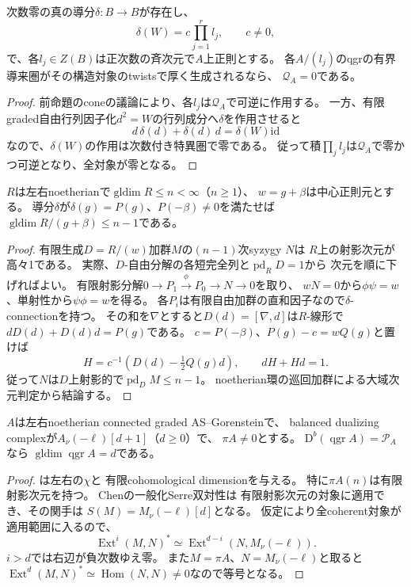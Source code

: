 \begin{proposition}[中心因子を持つ導分による切断判定]
\label{prop:gluing-derivation}
次数零の真の導分$\delta:B\to B$が存在し、
\[
 \delta(W)=c\prod_{j=1}^r l_j,\qquad c\ne0,
\]
で、各$l_j\in Z(B)$は正次数の斉次元で$A$上正則とする。
各$A/(l_j)$のqgrの有界導来圏がその構造対象のtwistsで厚く生成されるなら、
$\mathcal Q_A=0$である。
\end{proposition}
\begin{proof}
前命題のconeの議論により、各$l_j$は$\mathcal Q_A$で可逆に作用する。
一方、有限graded自由行列因子化$d^2=W$の行列成分へ$\delta$を作用させると
\[
 d\,\delta(d)+\delta(d)\,d=\delta(W)\mathrm{id}
\]
なので、$\delta(W)$の作用は次数付き特異圏で零である。
従って積$\prod_j l_j$は$\mathcal Q_A$で零かつ可逆となり、全対象が零となる。
\end{proof}

\begin{lemma}[中心値を動かす導分]
\label{lem:gluing-moving-central-value}
$R$は左右noetherianで$\operatorname{gldim}R\le n<\infty$（$n\ge1$）、
$w=g+\beta$は中心正則元とする。
導分$\delta$が$\delta(g)=P(g)$、$P(-\beta)\ne0$を満たせば
$\operatorname{gldim}R/(g+\beta)\le n-1$である。
\end{lemma}
\begin{proof}
有限生成$D=R/(w)$加群$M$の$(n-1)$次syzygy $N$は
$R$上の射影次元が高々1である。
実際、$D$-自由分解の各短完全列と$\operatorname{pd}_R D=1$から
次元を順に下げればよい。
有限射影分解$0\to P_1\xrightarrow{\phi}P_0\to N\to0$を取り、
$wN=0$から$\phi\psi=w$、単射性から$\psi\phi=w$を得る。
各$P_i$は有限自由加群の直和因子なので$\delta$-connectionを持つ。
その和を$\nabla$とすると$D(d)=[\nabla,d]$は$R$-線形で
$dD(d)+D(d)d=P(g)$である。
$c=P(-\beta)$、$P(g)-c=wQ(g)$と置けば
\[
 H=c^{-1}\left(D(d)-\tfrac12Q(g)d\right),\qquad dH+Hd=1.
\]
従って$N$は$D$上射影的で$\operatorname{pd}_D M\le n-1$。
noetherian環の巡回加群による大域次元判定から結論する。
\end{proof}

\begin{lemma}[perfect性とSerre双対性からの正確な次元]
\label{lem:gluing-serre-dimension}
$A$は左右noetherian connected graded AS--Gorensteinで、
balanced dualizing complexが$A_\nu(-\ell)[d+1]$（$d\ge0$）で、
$\pi A\ne0$とする。
$\mathrm D^b(\operatorname{qgr}A)=\mathcal P_A$なら
$\operatorname{gldim}\operatorname{qgr}A=d$である。
\end{lemma}
\begin{proof}
\cite[Theorem~4.2, Corollary~4.3]{YZSerre}は左右の$\chi$と
有限cohomological dimensionを与える。
特に$\pi A(n)$は有限射影次元を持つ。
Chen\cite[Theorem~3.10]{ChenGeneralizedSerre}の一般化Serre双対性は
有限射影次元の対象に適用でき、その関手は
$S(M)=M_\nu(-\ell)[d]$となる。
仮定により全coherent対象が適用範囲に入るので、
\[
 \operatorname{Ext}^i(M,N)^*
 \simeq\operatorname{Ext}^{d-i}(N,M_\nu(-\ell)).
\]
$i>d$では右辺が負次数ゆえ零。
また$M=\pi A$、$N=M_\nu(-\ell)$と取ると
$\operatorname{Ext}^d(M,N)^*\simeq\operatorname{Hom}(N,N)\ne0$なので等号となる。
\end{proof}
